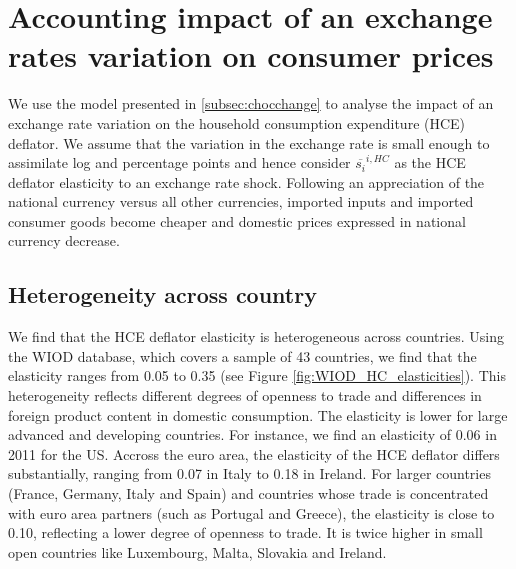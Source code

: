 \documentclass[12pt,a4paper]{paper}
\begin{document}
\section{Accounting impact of an exchange rates variation on consumer prices}
\label{sec:prixconso}
We use the model presented in \ref{subsec:chocchange} to analyse the impact of an exchange rate variation on the household consumption expenditure (HCE) deflator.
We assume that the variation in the exchange rate is small enough to assimilate log and percentage points and hence consider $\overline{s_{i}}^{i,HC}$ as the HCE deflator elasticity to an exchange rate shock. Following an appreciation of the national currency versus all other currencies, imported inputs and imported consumer goods become cheaper and domestic prices expressed in national currency decrease. 
\subsection{Heterogeneity across country}\label{subsec:heterogcountry}
We find that the HCE deflator elasticity is heterogeneous across countries.  
Using the WIOD database, which covers a sample of 43 countries, we find that the elasticity ranges from 0.05 to 0.35  (see Figure \ref{fig:WIOD_HC_elasticities}). 
This heterogeneity reflects different degrees of openness to trade and differences in foreign product content in domestic consumption. 
The elasticity is lower for large advanced and developing countries.
For instance, we find an elasticity of 0.06 in 2011 for the US. 
Accross the euro area, the elasticity of the HCE deflator differs substantially, ranging from 0.07 in Italy to 0.18 in Ireland. 
For larger countries (France, Germany, Italy and Spain) and countries whose trade is concentrated with euro area partners (such as Portugal and Greece), the elasticity is close to 0.10, reflecting a lower degree of openness to trade.  
It is twice higher in small open countries like Luxembourg, Malta, Slovakia and Ireland.\\

\end{document}
